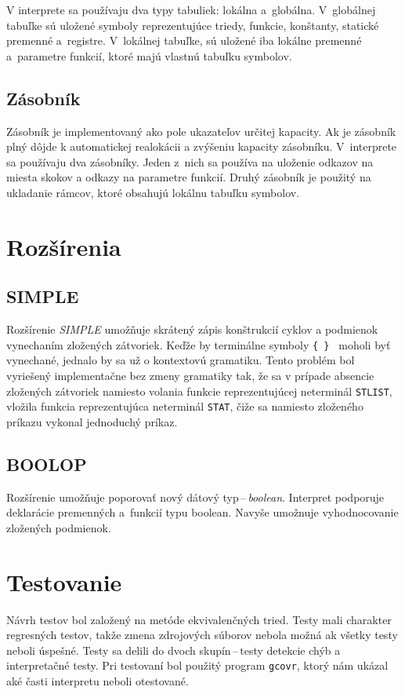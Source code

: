 \documentclass[11pt,a4paper]{article}
\begin{document}
        V interprete sa používaju dva typy tabuliek: lokálna a~globálna. V~globálnej
        tabuľke sú uložené symboly reprezentujúce triedy, funkcie, konštanty, statické
        premenné a~registre. V~lokálnej tabuľke, sú uložené iba lokálne premenné a~parametre
        funkcií, ktoré majú vlastnú tabuľku symbolov.

        \subsection{Zásobník}
        Zásobník je implementovaný ako pole ukazateľov určitej kapacity. Ak je zásobník
        plný dôjde k automatickej realokácii a zvýšeniu kapacity zásobníku.
        V~interprete sa používaju dva zásobníky. Jeden z~nich sa používa na uloženie
        odkazov na miesta skokov a odkazy na parametre funkcií. Druhý zásobník je
        použitý na ukladanie rámcov, ktoré obsahujú lokálnu tabuľku symbolov.

\section{Rozšírenia}
\label{rozsirenia}

    \subsection{SIMPLE}
    Rozšírenie \emph{SIMPLE} umožňuje skrátený zápis konštrukcií cyklov a
    podmienok vynechaním zložených zátvoriek. Keďže by terminálne symboly
    \texttt{\{ \} } moholi byť vynechané, jednalo by sa už o kontextovú gramatiku.
    Tento problém bol vyriešený implementačne bez zmeny
    gramatiky tak, že sa v prípade absencie zložených zátvoriek namiesto volania
    funkcie reprezentujúcej neterminál \texttt{STLIST}, vložila
    funkcia reprezentujúca neterminál \texttt{STAT}, čiže sa namiesto zloženého
    príkazu vykonal jednoduchý príkaz.

    \subsection{BOOLOP}
    Rozšírenie umožňuje poporovať nový dátový typ\,--\,\emph{boolean}. Interpret
    podporuje deklarácie premenných a~funkcií typu boolean. Navyše
    umožnuje vyhodnocovanie zložených podmienok.

\section{Testovanie}
\label{testovanie}
Návrh testov bol založený na metóde ekvivalenčných tried. Testy mali charakter
regresných testov, takže zmena zdrojových súborov nebola možná ak
všetky testy neboli úspešné. Testy sa delili do dvoch skupín\,--\,testy
detekcie chýb a interpretačné testy. Pri testovaní bol použitý program
\texttt{gcovr}, ktorý nám ukázal aké časti interpretu neboli otestované.
\end{document}

